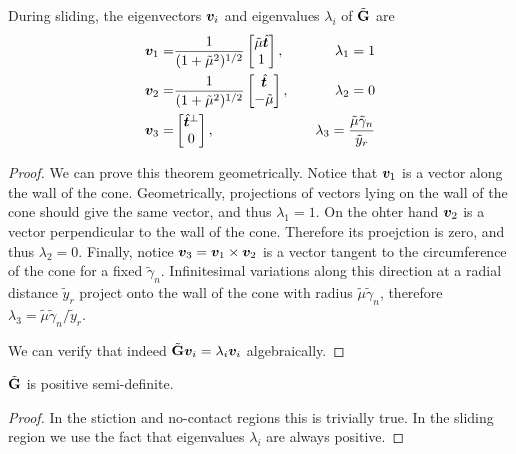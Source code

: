 
\begin{theorem}
During sliding, the eigenvectors ${\bm{v}}_i$ and eigenvalues $\lambda_i$ of
$\tilde{{\mathbf{G}}}$ are
\begin{eqnarray}
	\vf{v}_1 =& \frac{1}{(1+\tilde\mu^2)^{1/2}}
	\begin{bmatrix}
		\tilde\mu\sthat\\
		1 \end{bmatrix},&\quad\lambda_1 = 1\nonumber\\
	\vf{v}_2 =& \frac{1}{(1+\tilde\mu^2)^{1/2}}
	\begin{bmatrix}
		\sthat\\
		-\tilde\mu \end{bmatrix},&\quad\lambda_2 = 0\nonumber\\
	\vf{v}_3 =& 
	\begin{bmatrix}
		\sthat^\perp\\
		0 \end{bmatrix},&\quad\lambda_3 =
	\frac{\tilde\mu\tilde\gamma_n}{\tilde{y}_r}
	\label{eq:Gtilde_eigenvectors}
\end{eqnarray}
\end{theorem}
\begin{proof}
We can prove this theorem geometrically. Notice that ${\bm{v}}_1$ is a vector
along the wall of the cone. Geometrically, projections of vectors lying on the
wall of the cone should give the same vector, and thus $\lambda_1=1$. On the
ohter hand ${\bm{v}}_2$ is a vector perpendicular to the wall of the cone.
Therefore its proejction is zero, and thus $\lambda_2=0$. Finally, notice
${\bm{v}}_3 = {\bm{v}}_1\times{\bm{v}}_2$ is a vector tangent to the circumference of
the cone for a fixed $\tilde\gamma_n$. Infinitesimal variations along this
direction at a radial distance $\tilde{y}_r$ project onto the wall of the cone
with radius $\tilde\mu\tilde\gamma_n$, therefore
$\lambda_3=\tilde\mu\tilde\gamma_n/\tilde{y}_r$.

We can verify that indeed $\tilde{{\mathbf{G}}}{\bm{v}}_i=\lambda_i{\bm{v}}_i$ algebraically.
\end{proof}
\begin{corollary}
$\tilde{{\mathbf{G}}}$ is positive semi-definite.
\end{corollary}
\begin{proof}
In the stiction and no-contact regions this is trivially true. In the sliding
region we use the fact that eigenvalues $\lambda_i$ are always positive.
\end{proof}

